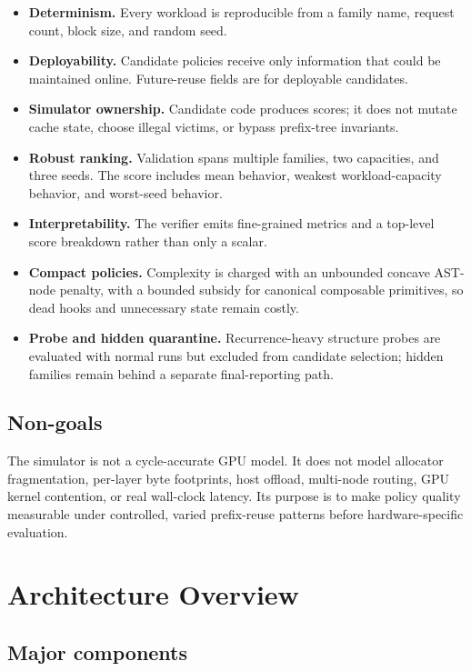 \documentclass[11pt]{article}
\newcommand{\code}[1]{\texttt{\detokenize{#1}}}
\newcommand{\important}[1]{\textbf{\color{navy}#1}}
\begin{document}
\begin{itemize}
  \item \important{Determinism.} Every workload is reproducible from a family name,
  request count, block size, and random seed.
  \item \important{Deployability.} Candidate policies receive only information that
  could be maintained online.  Future-reuse fields are \code{None} for deployable
  candidates.
  \item \important{Simulator ownership.} Candidate code produces scores; it does not
  mutate cache state, choose illegal victims, or bypass prefix-tree invariants.
  \item \important{Robust ranking.} Validation spans multiple families, two capacities,
  and three seeds.  The score includes mean behavior, weakest workload-capacity
  behavior, and worst-seed behavior.
  \item \important{Interpretability.} The verifier emits fine-grained metrics and a
  top-level score breakdown rather than only a scalar.
  \item \important{Compact policies.} Complexity is charged with an unbounded concave
  AST-node penalty, with a bounded subsidy for canonical composable primitives, so dead
  hooks and unnecessary state remain costly.
  \item \important{Probe and hidden quarantine.} Recurrence-heavy structure probes are
  evaluated with normal runs but excluded from candidate selection; hidden families
  remain behind a separate final-reporting path.
\end{itemize}

\subsection{Non-goals}

The simulator is not a cycle-accurate GPU model.  It does not model allocator
fragmentation, per-layer byte footprints, host offload, multi-node routing, GPU kernel
contention, or real wall-clock latency.  Its purpose is to make policy quality
measurable under controlled, varied prefix-reuse patterns before hardware-specific
evaluation.

\section{Architecture Overview}

\subsection{Major components}
\end{document}
